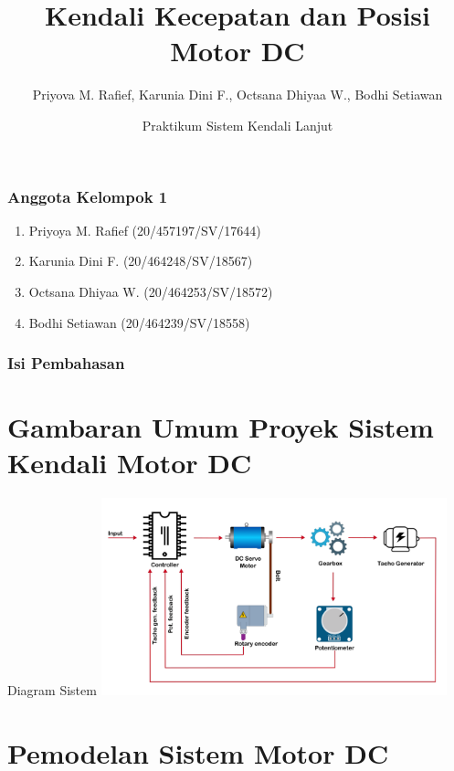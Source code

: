 \documentclass[10pt,xcolor={dvipsnames}]{beamer}
\title[UGM]{Kendali Kecepatan dan Posisi Motor DC}%
\author[Kelompok 1]{Priyova M. Rafief\inst{1}, Karunia Dini F.\inst{1}, Octsana Dhiyaa W.\inst{1}, Bodhi Setiawan\inst{1}}%
\institute[UGM]{Universitas Gadjah Mada\inst{1}}
\date[\textcolor{white}{PSKL, 2022}]
{Praktikum Sistem Kendali Lanjut}
\begin{document}
	

	\frame{\titlepage}
	
	\begin{frame}
		\frametitle{Anggota Kelompok 1}
		\begin{enumerate}
			\item Priyoya M. Rafief (20/457197/SV/17644)
			\item Karunia Dini F. (20/464248/SV/18567)
			\item Octsana Dhiyaa W. (20/464253/SV/18572)
			\item Bodhi Setiawan (20/464239/SV/18558)
		\end{enumerate}
	\end{frame}
	
	\begin{frame}
		\frametitle{Isi Pembahasan}
		    \tableofcontents
	\end{frame}
	
	\section{Gambaran Umum Proyek Sistem Kendali Motor DC}
	
	\begin{frame}{Diagram Sistem}
		\centering
		\includegraphics[width=10cm]{Gambar Lain/diagramDCservo.png}
	\end{frame}
	
	\section{Pemodelan Sistem Motor DC}
	
\end{document}

